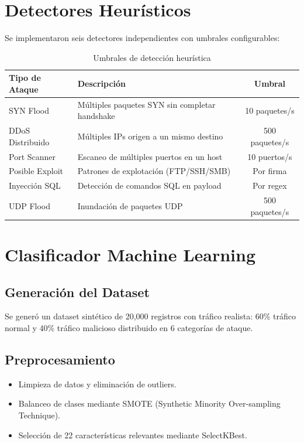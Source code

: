 \documentclass[12pt,letterpaper]{report}
\begin{document}
\section{Detectores Heurísticos}

Se implementaron seis detectores independientes con umbrales configurables:

\begin{table}[H]
  \centering
  \caption{Umbrales de detección heurística}
  \label{tab:umbrales}
  \begin{tabularx}{\textwidth}{lXc}
    \toprule
    \textbf{Tipo de Ataque} & \textbf{Descripción} & \textbf{Umbral} \\
    \midrule
    SYN Flood & Múltiples paquetes SYN sin completar handshake & 10 paquetes/s \\
    DDoS Distribuido & Múltiples IPs origen a un mismo destino & 500 paquetes/s \\
    Port Scanner & Escaneo de múltiples puertos en un host & 10 puertos/s \\
    Posible Exploit & Patrones de explotación (FTP/SSH/SMB) & Por firma \\
    Inyección SQL & Detección de comandos SQL en payload & Por regex \\
    UDP Flood & Inundación de paquetes UDP & 500 paquetes/s \\
    \bottomrule
  \end{tabularx}
\end{table}

\section{Clasificador Machine Learning}

\subsection{Generación del Dataset}

Se generó un dataset sintético de 20,000 registros con tráfico realista: 60\% tráfico normal y 40\% tráfico malicioso distribuido en 6 categorías de ataque.

\subsection{Preprocesamiento}

\begin{itemize}
  \item Limpieza de datos y eliminación de outliers.
  \item Balanceo de clases mediante SMOTE (Synthetic Minority Over-sampling Technique).
  \item Selección de 22 características relevantes mediante SelectKBest.
\end{itemize}
\end{document}
